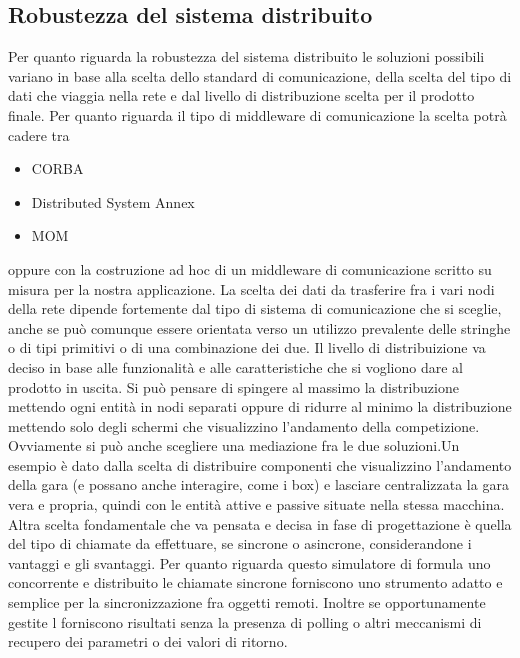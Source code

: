 \subsection{Robustezza del sistema distribuito }
Per quanto riguarda la robustezza del sistema distribuito le soluzioni possibili
variano in base alla scelta dello standard di comunicazione, della scelta del
tipo di dati che viaggia nella rete e dal livello di distribuzione scelta per il
prodotto finale.
Per quanto riguarda il tipo di middleware di comunicazione la scelta potr\`{a}
cadere tra 
\begin{itemize}
\item CORBA
\item Distributed System Annex 
\item MOM
\end{itemize}
oppure con la costruzione ad hoc di un middleware di comunicazione scritto su
misura per la nostra applicazione.
La scelta dei dati da trasferire fra i vari nodi della rete dipende fortemente
dal tipo di sistema di comunicazione che si sceglie, anche se può comunque
essere orientata verso un utilizzo prevalente delle stringhe o di tipi primitivi
o di una combinazione dei due. Il livello di distribuizione va deciso in base
alle funzionalit\`{a} e alle caratteristiche che si vogliono dare al prodotto in
uscita. Si può pensare di spingere al massimo la distribuzione mettendo ogni
entit\`{a} in nodi separati oppure di ridurre al minimo la distribuzione
mettendo solo degli schermi che visualizzino l'andamento della competizione.
Ovviamente si pu\`{o} anche scegliere una mediazione fra le due soluzioni.Un
esempio \`{e} dato dalla scelta di distribuire componenti che visualizzino
l'andamento della gara (e possano anche interagire, come i box) e lasciare
centralizzata la gara vera e propria, quindi con le entit\`{a} attive e passive
situate nella stessa macchina. Altra scelta fondamentale che va pensata e decisa
in fase di progettazione \`{e} quella del tipo di chiamate da effettuare, se
sincrone o asincrone, considerandone i vantaggi e gli svantaggi. Per quanto
riguarda questo simulatore di formula uno concorrente e distribuito le chiamate
sincrone forniscono uno strumento adatto e semplice per la sincronizzazione fra
oggetti remoti. Inoltre se opportunamente gestite l forniscono risultati senza
la presenza di polling o altri meccanismi di recupero dei parametri o dei valori
di ritorno.
